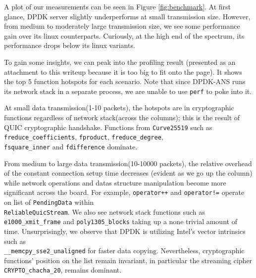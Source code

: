 \documentclass{sig-alternate-05-2015}
\begin{document}
A plot of our measurements can be seen in Figure \ref{fig:benchmark}. At first glance, DPDK server slightly underperforms at small transmission size. However, from medium to moderately large transmission size, we see some performance gain over its linux counterparts. Curiously, at the high end of the spectrum, its performance drops below its linux variants. 

To gain some insights, we can peak into the profiling result (presented as an attachment to this writeup because it is too big to fit onto the page). It shows the top 5 function hotspots for each scenario. Note that since DPDK-ANS runs its network stack in a separate process, we are unable to use \texttt{perf} to poke into it. 

At small data transmission(1-10 packets), the hotspots are in cryptographic functions regardless of network stack(across the columns); this is the result of QUIC cryptographic handshake. Functions from \verb|Curve25519| such as\\ \verb|freduce_coefficients|, \verb|fproduct|, \verb|freduce_degree|, \\ \verb|fsquare_inner| and \verb|fdifference| dominate.

From medium to large data transmission(10-10000 packets), the relative overhead of the constant connection setup time decreases (evident as we go up the column) while network operations and datas structure manipulation become more significant across the board. For example, \verb|operator++| and \verb|operator!=| operate on list of \verb|PendingData| within\\ \verb|ReliableQuicStream|. We also see network stack functions such as \verb|e1000_xmit_frame| and \verb|poly1305_blocks| taking up a none trivial amount of time. Unsurprisingly, we observe that DPDK is utilizing Intel's vector intrinsics such as\\ \verb|__memcpy_sse2_unaligned| for faster data copying. Nevertheless, cryptographic functions' position on the list remain invariant, in particular the streaming cipher\\ \verb|CRYPTO_chacha_20|, remains dominant. 
\end{document}

